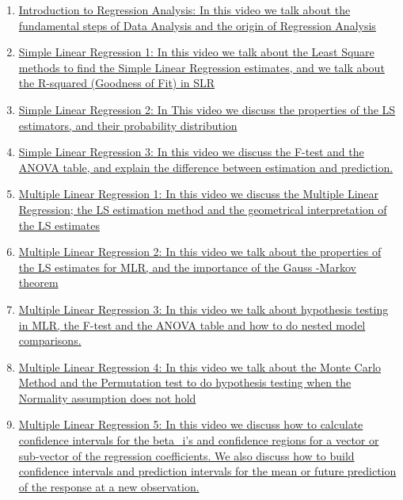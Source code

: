 \documentclass[11pt]{article}
\begin{document}
\begin{enumerate}
	\item \href{https://mp.weixin.qq.com/s/yUeFyOxG3cUc2goY26DFCg}{Introduction to Regression Analysis: In this video we talk about the fundamental steps of Data Analysis and the origin of Regression Analysis}	%
	\item \href{https://mp.weixin.qq.com/s/jp2E23_TAq3VJGKZ4Gn_-Q}{Simple Linear Regression 1: In this video we talk about the Least Square methods to find the Simple Linear Regression estimates, and we talk about the R-squared (Goodness of Fit) in SLR}	%
	\item \href{https://mp.weixin.qq.com/s/qTHAQGuV4OtyqeKVVO3ceA}{Simple Linear Regression 2: In This video we discuss the properties of the LS estimators, and their probability  distribution}	%
	\item \href{https://mp.weixin.qq.com/s/Di7xXeR3jX62Al9qdSvqzg}{Simple Linear Regression 3: In this video we discuss the F-test and the ANOVA table, and explain the difference between estimation and prediction.}	%
	\item \href{https://mp.weixin.qq.com/s/I7npJx93v2ZdqTHnkdgb2A}{Multiple Linear Regression 1: In this video we discuss the Multiple Linear Regression; the LS estimation method and the geometrical interpretation of the LS estimates}	%
	\item \href{https://mp.weixin.qq.com/s/Xuqb-kd7hk1sUuzyv3Ve8g}{Multiple Linear Regression 2: In this video we talk about the properties of the LS estimates for MLR, and the importance of the Gauss -Markov theorem}	%
	\item \href{https://mp.weixin.qq.com/s/fMI2ZhPIDFQgWkv0qyLfMQ}{Multiple Linear Regression 3: In this video we talk about hypothesis testing in MLR, the F-test and the ANOVA table and how to do nested model comparisons.}	%
	\item \href{https://mp.weixin.qq.com/s/e4kItE_7S-z0I45mj5QF4w}{Multiple Linear Regression 4: In this video we talk about the Monte Carlo Method and the Permutation test to do hypothesis testing when the Normality assumption does not hold}	%
	\item \href{https://mp.weixin.qq.com/s/zFm7FAPcdJU_Ygob3Th7lQ}{Multiple Linear Regression 5: In this video we discuss how to calculate confidence intervals for the beta\_i's and confidence regions for a vector or sub-vector of the regression coefficients. We also discuss how to build confidence intervals and prediction intervals for the mean or future prediction of the response at a new observation.}	%

\end{enumerate}
\end{document}

